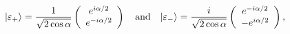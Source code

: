 \begin{equation}
|\varepsilon_+\rangle=\frac{1}{\sqrt{2\cos\alpha}}\left(\begin{array}{c}
e^{i\alpha/2}\cr e^{-i\alpha/2}\end{array}\right)\quad{\rm
and}\quad
|\varepsilon_-\rangle=\frac{i}{\sqrt{2\cos\alpha}}\left(\begin{array}{c}
e^{-i\alpha/2}\cr-e^{i\alpha/2}\end{array}\right), \label{e22}
\end{equation}

